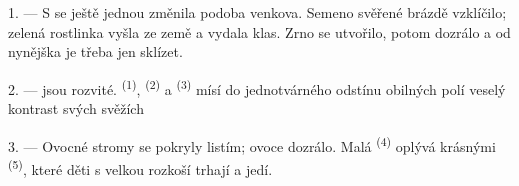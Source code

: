 %
%
%


\VUsaut{5.0mm}
\VUsaut{3.0mm}
\VUsaut{3.0mm}
\VUsaut{4.0mm}
\VUsaut{3.0mm}

1. --- S  se ještě jednou změnila podoba venkova. Semeno svěřené brázdě
vzklíčilo; zelená rostlinka vyšla ze země a vydala klas. Zrno se utvořilo, potom dozrálo a od
nynějška je třeba jen sklízet.

2. ---  jsou rozvité.  \textsuperscript{(1)},
 \textsuperscript{(2)} a 
\textsuperscript{(3)} mísí do jednotvárného odstínu obilných polí veselý kontrast svých
svěžích 

3. --- Ovocné stromy se pokryly listím; ovoce dozrálo. Malá 
\textsuperscript{(4)} oplývá krásnými  \textsuperscript{(5)}, které děti s
velkou rozkoší trhají a jedí.


